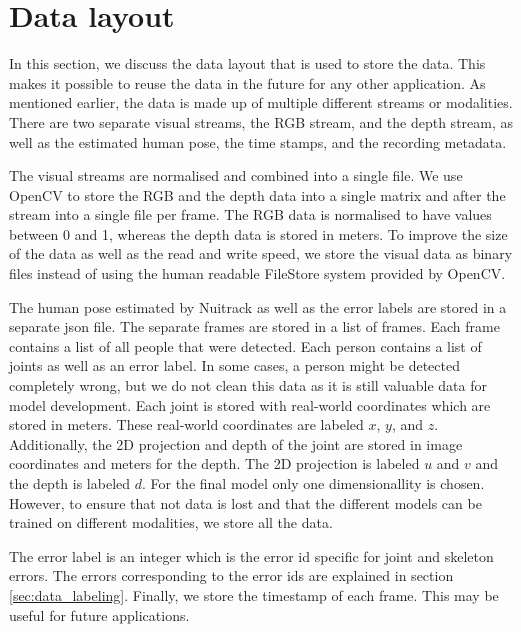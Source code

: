 \section{Data layout}

In this section, we discuss the data layout that is used to store the data. This makes it possible to reuse the data in the future for any other application. As mentioned earlier, the data is made up of multiple different streams or modalities. There are two separate visual streams, the RGB stream, and the depth stream, as well as the estimated human pose, the time stamps, and the recording metadata.

The visual streams are normalised and combined into a single file. We use OpenCV to store the RGB and the depth data into a single matrix and after the stream into a single file per frame. The RGB data is normalised to have values between 0 and 1, whereas the depth data is stored in meters. To improve the size of the data as well as the read and write speed, we store the visual data as binary files instead of using the human readable FileStore system provided by OpenCV.

The human pose estimated by Nuitrack as well as the error labels are stored in a separate json file. The separate frames are stored in a list of frames. Each frame contains a list of all people that were detected. Each person contains a list of joints as well as an error label. In some cases, a person might be detected completely wrong, but we do not clean this data as it is still valuable data for model development. Each joint is stored with real-world coordinates which are stored in meters. These real-world coordinates are labeled $x$, $y$, and $z$. Additionally, the 2D projection and depth of the joint are stored in image coordinates and meters for the depth. The 2D projection is labeled $u$ and $v$ and the depth is labeled $d$. For the final model only one dimensionallity is chosen. However, to ensure that not data is lost and that the different models can be trained on different modalities, we store all the data.

The error label is an integer which is the error id specific for joint and skeleton errors. The errors corresponding to the error ids are explained in section \ref{sec:data_labeling}. Finally, we store the timestamp of each frame. This may be useful for future applications.
